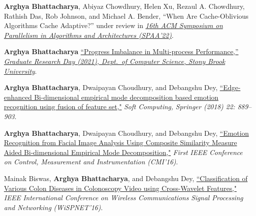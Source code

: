 \documentclass[letterpaper,10pt]{article}
\begin{document}
\item {\textbf{Arghya Bhattacharya}, Abiyaz Chowdhury, Helen Xu, Rezaul A. Chowdhury, Rathish Das, Rob Johnson, and Michael A. Bender, {``When Are Cache-Oblivious Algorithms Cache Adaptive?''} under review in \href{https://spaa.acm.org}{\textit{16th ACM Symposium on Parallelism in Algorithms and Architectures (SPAA'22)}}}.

\item {\textbf{Arghya Bhattacharya}
\href{https://www3.cs.stonybrook.edu/~grd/posters/GRD_2021_Poster_Arghya_Bhattacharya.pdf}{``Progress Imbalance in Multi-process Performance,''} \href{https://www3.cs.stonybrook.edu/~grd/index.html}{\textit{Graduate Research Day (2021), Dept.\ of Computer Science, Stony Brook University}}.}

\item {\textbf{Arghya Bhattacharya}, Dwaipayan Choudhury, and Debangshu Dey, \href{https://doi.org/10.1007/s00500-016-2395-4}{``Edge-enhanced Bi-dimensional empirical mode decomposition based emotion recognition using fusion of feature set,"} \textit{Soft Computing, Springer (2018) 22: 889--903}.}

\item {\textbf{Arghya Bhattacharya}, Dwaipayan Choudhury, and Debangshu Dey, \href{https://doi.org/10.1109/CMI.2016.7413766}{``Emotion Recognition from Facial Image Analysis Using Composite Similarity Measure Aided Bi-dimensional Empirical Mode Decomposition,"} \textit{First IEEE Conference on Control, Measurement and Instrumentation (CMI’16)}.}

\item {Mainak Biswas, \textbf{Arghya Bhattacharya}, and Debangshu Dey, \href{https://doi.org/10.1109/WiSPNET.2016.7566521} {``Classification of Various Colon Diseases in Colonoscopy Video using Cross-Wavelet Features,"} \textit{IEEE International Conference on Wireless Communications Signal Processing and Networking (WiSPNET'16)}.}
\resumeSubHeadingListEnd
\end{document}
